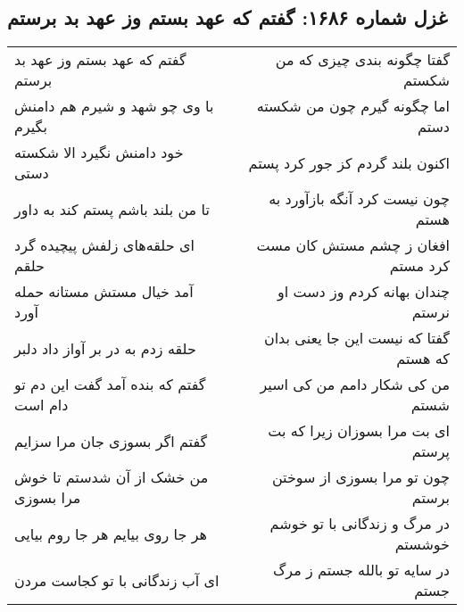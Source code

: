 \begin{center}
\section*{غزل شماره ۱۶۸۶: گفتم که عهد بستم وز عهد بد برستم}
\label{sec:1686}
\begin{longtable}{l p{0.5cm} r}
گفتم که عهد بستم وز عهد بد برستم
&&
گفتا چگونه بندی چیزی که من شکستم
\\
با وی چو شهد و شیرم هم دامنش بگیرم
&&
اما چگونه گیرم چون من شکسته دستم
\\
خود دامنش نگیرد الا شکسته دستی
&&
اکنون بلند گردم کز جور کرد پستم
\\
تا من بلند باشم پستم کند به داور
&&
چون نیست کرد آنگه بازآورد به هستم
\\
ای حلقه‌های زلفش پیچیده گرد حلقم
&&
افغان ز چشم مستش کان مست کرد مستم
\\
آمد خیال مستش مستانه حمله آورد
&&
چندان بهانه کردم وز دست او نرستم
\\
حلقه زدم به در بر آواز داد دلبر
&&
گفتا که نیست این جا یعنی بدان که هستم
\\
گفتم که بنده آمد گفت این دم تو دام است
&&
من کی شکار دامم من کی اسیر شستم
\\
گفتم اگر بسوزی جان مرا سزایم
&&
ای بت مرا بسوزان زیرا که بت پرستم
\\
من خشک از آن شدستم تا خوش مرا بسوزی
&&
چون تو مرا بسوزی از سوختن برستم
\\
هر جا روی بیایم هر جا روم بیایی
&&
در مرگ و زندگانی با تو خوشم خوشستم
\\
ای آب زندگانی با تو کجاست مردن
&&
در سایه تو بالله جستم ز مرگ جستم
\\
\end{longtable}
\end{center}
